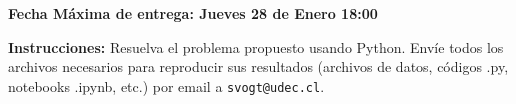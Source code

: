 \documentclass[11pt]{exam}
\begin{document}
\firstpageheadrule
\runningheadrule
{}
\cfoot{ }
\begin{flushleft}
\vspace{0.2in}
\vspace{0.25cm}
\end{flushleft}

\begin{center}
\textbf{Fecha Máxima de entrega: Jueves 28 de Enero 18:00}
\end{center}
\textbf{Instrucciones:} \noindent Resuelva el problema propuesto usando Python. Envíe todos los archivos necesarios para reproducir sus resultados (archivos de datos, códigos .py, notebooks .ipynb, etc.) por email a \texttt{svogt@udec.cl}.

\bigskip
\end{document}
